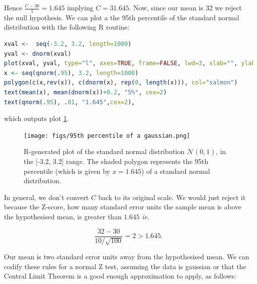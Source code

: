 \documentclass{homework}
\begin{document}
Hence $\frac{C-30}{1}=1.645$ implying $C=31.645$. Now, since our mean is $32$ we reject the null hypothesis. We can plot a the 95th percentile of the standard normal distribution with the following R routine:

\clearpage

\begin{lstlisting}[language=R]
xval <-  seq(-3.2, 3.2, length=1000)
yval <- dnorm(xval)
plot(xval, yval, type="l", axes=TRUE, frame=FALSE, lwd=3, xlab="", ylab="")
x <- seq(qnorm(.95), 3.2, length=1000)
polygon(c(x,rev(x)), c(dnorm(x), rep(0, length(x))), col="salmon")
text(mean(x), mean(dnorm(x))+0.2, "5%", cex=2)
text(qnorm(.95), .01, "1.645",cex=2),
\end{lstlisting} 

which outputs plot \ref{fig: normal Z test}. 

\begin{figure}
    \centering
    \texttt{[image: figs/95th percentile of a gaussian.png]} 
    \caption{R-generated plot of the standard normal distribution $\mathcal{N}(0,1)$,  in the [-3.2, 3.2] range. The shaded polygon represents the 95th percentile (which is given by $x=1.645$) of a standard normal distribution. }
    \label{fig: normal Z test}
\end{figure}

In general, we don't convert $C$ back to its original scale. We would just reject it because the Z-score, how many standard error units the sample mean is above the hypothesised mean, is greater than $1.645$ \textit{ie. }

$$
\frac{32-30}{10/\sqrt{100}} = 2 > 1.645.
$$

Our mean is two standard error units away from the hypothesised mean. We can codify these rules for a normal Z test, assuming the data is gaussian or that the Central Limit Theorem is a good enough approximation to apply, as follows:
\end{document}
